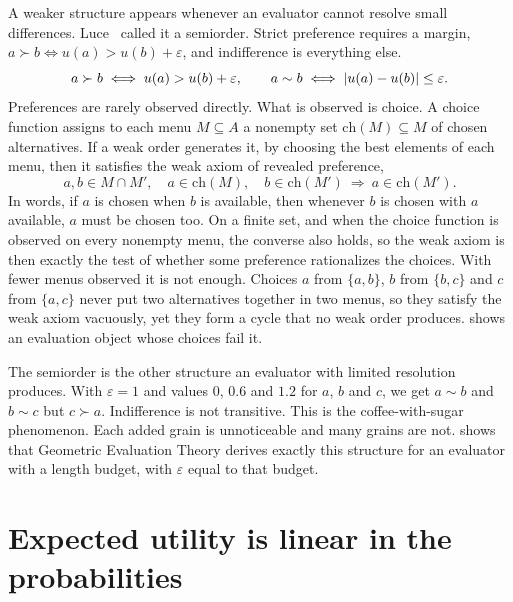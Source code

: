 A weaker structure appears whenever an evaluator cannot resolve small differences. Luce~\cite{luce1956} called it a semiorder. Strict preference requires a margin, $a\succ b\iff u(a)>u(b)+\varepsilon$, and indifference is everything else.
\begin{equation}\label{eq:ch08:semiorder}
a\succ b\iff u(a)>u(b)+\varepsilon,\qquad a\sim b\iff \lvert u(a)-u(b)\rvert\le\varepsilon .
\end{equation}
Preferences are rarely observed directly. What is observed is choice. A choice function assigns to each menu $M\subseteq A$ a nonempty set $\mathrm{ch}(M)\subseteq M$ of chosen alternatives. If a weak order generates it, by choosing the best elements of each menu, then it satisfies the weak axiom of revealed preference,
\begin{equation}\label{eq:ch08:warp}
a,b\in M\cap M',\quad a\in\mathrm{ch}(M),\quad b\in\mathrm{ch}(M')\ \Longrightarrow\ a\in\mathrm{ch}(M').
\end{equation}
In words, if $a$ is chosen when $b$ is available, then whenever $b$ is chosen with $a$ available, $a$ must be chosen too. On a finite set, and when the choice function is observed on every nonempty menu, the converse also holds, so the weak axiom is then exactly the test of whether some preference rationalizes the choices. With fewer menus observed it is not enough. Choices $a$ from $\{a,b\}$, $b$ from $\{b,c\}$ and $c$ from $\{a,c\}$ never put two alternatives together in two menus, so they satisfy the weak axiom vacuously, yet they form a cycle that no weak order produces.  shows an evaluation object whose choices fail it.

The semiorder is the other structure an evaluator with limited resolution produces. With $\varepsilon=1$ and values $0$, $0.6$ and $1.2$ for $a$, $b$ and $c$, we get $a\sim b$ and $b\sim c$ but $c\succ a$. Indifference is not transitive. This is the coffee-with-sugar phenomenon. Each added grain is unnoticeable and many grains are not.  shows that Geometric Evaluation Theory derives exactly this structure for an evaluator with a length budget, with $\varepsilon$ equal to that budget.


\section{Expected utility is linear in the probabilities}\label{sec:ch08:eu}

